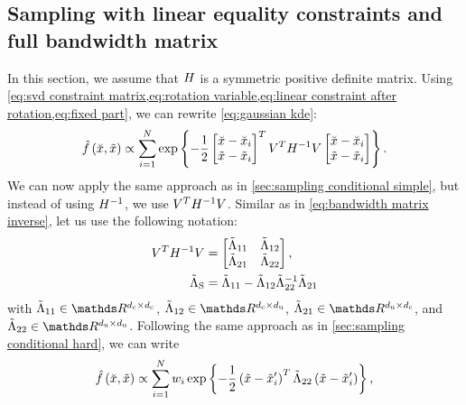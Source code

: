 \subsection{Sampling with linear equality constraints and full bandwidth matrix}
\label{sec:sampling constrained hard}

In this section, we assume that $H$ is a symmetric positive definite matrix. 
Using \cref{eq:svd constraint matrix,eq:rotation variable,eq:linear constraint after rotation,eq:fixed part}, we can rewrite \cref{eq:gaussian kde}:
\begin{equation*}
	\hat{f}\left( \breve{x}, \tilde{x} \right) 
	\propto \sum_{i=1}^{N}
	\exp\left\{  -\frac{1}{2} 
		\begin{bmatrix} 
			\breve{x} - \breve{x}_{i} \\ 
			\tilde{x} - \tilde{x}_{i}
		\end{bmatrix}^T V^T H^{-1} V
		\begin{bmatrix} 
			\breve{x} - \breve{x}_{i} \\ 
			\tilde{x} - \tilde{x}_{i}
		\end{bmatrix}
	 \right\}.
\end{equation*}
We can now apply the same approach as in \cref{sec:sampling conditional simple}, but instead of using $H^{-1}$, we use $V^T H^{-1} V$.
Similar as in \cref{eq:bandwidth matrix inverse}, let us use the following notation:
\begin{align}
	V^T H^{-1} V 
	&= \begin{bmatrix} \tilde{\Lambda}_{11} & \tilde{\Lambda}_{12} \\ \tilde{\Lambda}_{21} & \tilde{\Lambda}_{22} \end{bmatrix}, \label{eq:rotated matrix inverse} \\
	\tilde{\Lambda}_{\mathrm{S}} &= \tilde{\Lambda}_{11} - \tilde{\Lambda}_{12} \tilde{\Lambda}_{22}^{-1} \tilde{\Lambda}_{21} \label{eq:rotated schur complement}
\end{align}
with $\bwriul \in \realnumbers^{\dimensionparta \times \dimensionparta}$, $\bwriur \in \realnumbers^{\dimensionparta \times \dimensionpartb}$, $\bwribl \in \realnumbers^{\dimensionpartb \times \dimensionparta}$, and $\bwribr \in \realnumbers^{\dimensionpartb \times \dimensionpartb}$. Following the same approach as in \cref{sec:sampling conditional hard}, we can write
\begin{equation*}
	\hat{f}\left( \breve{x}, \tilde{x} \right)
	\propto \sum_{i=1}^{N} w_{i}
	\exp\left\{  -\frac{1}{2} \left( \tilde{x} - \tilde{x}_{i}' \right)^T
		\tilde{\Lambda}_{22} \left( \tilde{x} - \tilde{x}_{i}' \right) \right\},
\end{equation*}
